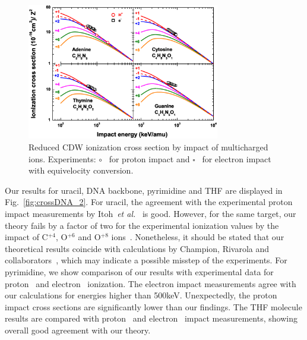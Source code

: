 \documentclass[preprint]{revtex4-2}
\begin{document}
\begin{figure}[t!]
\centering
\includegraphics[width=0.75\textwidth]{figuras/Fig_finales/fig2.eps}
\caption{Reduced CDW ionization cross section by impact of multicharged 
ions. Experiments: \mbox{\Large$\circ$}~\cite{iriki2011} for proton 
impact and $\square$~\cite{rahman2016} for electron impact with 
equivelocity conversion.}
\label{fig:crossDNA_1}
\end{figure} 

Our results for uracil, DNA backbone, pyrimidine and THF are displayed 
in Fig.~\ref{fig:crossDNA_2}. For uracil, the agreement with the 
experimental proton impact measurements by 
Itoh~{\it et al.}~\cite{itoh2013} is good.
However, for the same target, our theory fails by a factor of two for 
the experimental ionization values by the impact of 
C$^{+4}$, O$^{+6}$ and O$^{+8}$ ions~\cite{agnihotri2012,agnihotri2013}.
Nonetheless, it should be stated that our theoretical results coincide 
with calculations by Champion, Rivarola and 
collaborators~\cite{agnihotri2012,champion2012}, which may indicate a 
possible misstep of the experiments. 
For pyrimidine, we show comparison of our results with experimental data
for proton~\cite{wolff2014} and electron~\cite{bug2017} ionization. 
The electron impact measurements 
agree with our calculations for energies higher than 500keV. 
Unexpectedly, the proton impact cross sections are significantly lower 
than our findings. 
The THF molecule results are compared with proton~\cite{wang2016} 
and electron~\cite{bug2017,wolf2019,fuss2009} impact measurements, showing
overall good agreement with our theory. 
\end{document}

